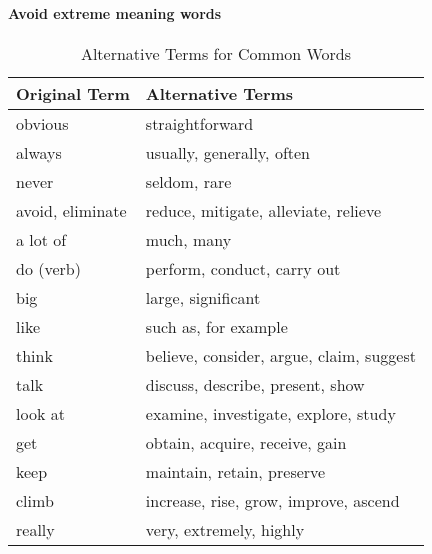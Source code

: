 \paragraph{Avoid extreme meaning words}

\begin{table}[ht]
	\caption{Alternative Terms for Common Words}\label{tab:alternative_terms}
	\centering
	\begin{tabular}{@{}ll@{}}
		\toprule
		Original Term    & Alternative Terms                        \\
		\midrule
		obvious          & straightforward                          \\
		always           & usually, generally, often                \\
		never            & seldom, rare                             \\
		avoid, eliminate & reduce, mitigate, alleviate, relieve     \\
		a lot of         & much, many                               \\
		do (verb)        & perform, conduct, carry out              \\
		big              & large, significant                       \\
		like             & such as, for example                     \\
		think            & believe, consider, argue, claim, suggest \\
		talk             & discuss, describe, present, show         \\
		look at          & examine, investigate, explore, study     \\
		get              & obtain, acquire, receive, gain           \\
		keep             & maintain, retain, preserve               \\
		climb            & increase, rise, grow, improve, ascend    \\
		really           & very, extremely, highly                  \\
		\bottomrule
	\end{tabular}
\end{table}


